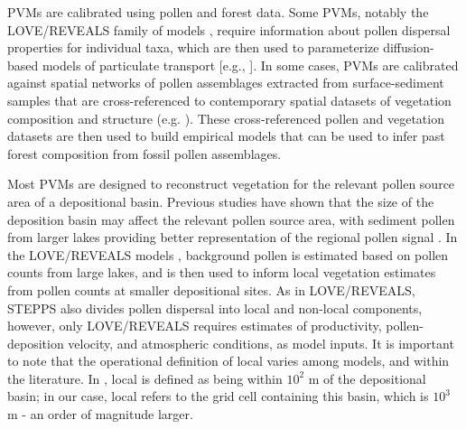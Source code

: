 \documentclass[12pt]{article}
\begin{document}
PVMs are calibrated using pollen and forest data. Some PVMs, notably
the LOVE/REVEALS family of models \citep{sugita2007theory1,
  sugita2007theory2}, require information about pollen dispersal
properties for individual taxa, which are then used to parameterize
diffusion-based models of particulate transport [e.g.,
  \citet{prentice1985pollen}]. In some cases, PVMs are calibrated
against spatial networks of pollen assemblages extracted from surface-sediment samples that are cross-referenced to contemporary spatial
datasets of vegetation composition and structure
(e.g. \citet{webb1981estimating, williams2003variations}). These
cross-referenced pollen and vegetation datasets are then used to build
empirical models that can be used to infer past forest composition
from fossil pollen assemblages.

Most PVMs are designed to reconstruct vegetation for the relevant
pollen source area of a depositional basin. Previous studies have
shown that the size of the deposition basin may affect the relevant
pollen source area, with sediment pollen from larger lakes providing
better representation of the regional pollen signal
\citep{jacobson1981selection, prentice1985pollen, sugita1994pollen,
  sugita2007theory1}. In the LOVE/REVEALS models
\citep{sugita2007theory1, sugita2007theory2}, background pollen is
estimated based on pollen counts from large lakes, and is then used to
inform local vegetation estimates from pollen counts at smaller
depositional sites. As in LOVE/REVEALS, STEPPS also divides pollen
dispersal into local and non-local components, however, only
LOVE/REVEALS requires estimates of productivity, pollen-deposition
velocity, and atmospheric conditions, as model inputs. It is important
to note that the operational definition of local varies among models,
and within the literature. In \citet{jacobson1981selection}, local is
defined as being within $10^2$ m of the depositional basin; in our
case, local refers to the grid cell containing this basin, which is
$10^3$ m - an order of magnitude larger.
\end{document}
